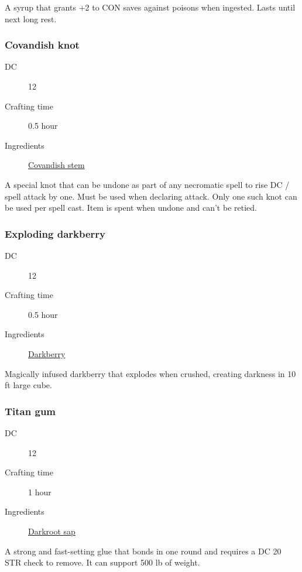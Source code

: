 A syrup that grants +2 to CON saves against poisons when ingested. Lasts until next long rest.

\subsubsection{Covandish knot}
\label{Covandish knot}

\begin{description}
\item [DC] 12
\item [Crafting time] 0.5 hour
\item [Ingredients] \hyperref[Covadish]{Covandish stem}
\end{description}

A special knot that can be undone as part of any necromatic spell to rise DC / spell attack by one. Must be used when declaring attack. 
Only one such knot can be used per spell cast. Item is spent when undone and can't be retied.

\subsubsection{Exploding darkberry}
\label{Exploding darkberry}

\begin{description}
\item [DC] 12
\item [Crafting time] 0.5 hour
\item [Ingredients] \hyperref[Darkberry]{Darkberry}
\end{description}

Magically infused darkberry that explodes when crushed, creating darkness in 10 ft large cube.

\subsubsection{Titan gum}
\label{Titan gum}

\begin{description}
\item [DC] 12
\item [Crafting time] 1 hour
\item [Ingredients] \hyperref[Darkroot]{Darkroot sap}
\end{description}

A strong and fast-setting glue that bonds in one round and 
requires a DC 20 STR check to remove. It can support 500 lb of weight.

